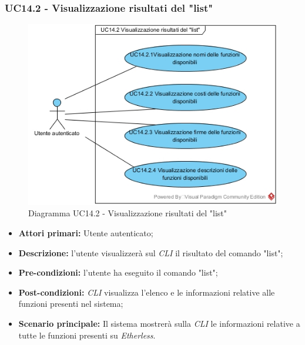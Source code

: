 \subsubsection{UC14.2 - Visualizzazione risultati del "list"}
\begin{figure}[h]
	\centering
	\includegraphics[width=0.7\linewidth]{res/img/UC14.2.jpg}
	\caption{Diagramma UC14.2 - Visualizzazione risultati del "list"}
\end{figure}
\begin{itemize}
	\item \textbf{Attori primari:} Utente autenticato;
	\item \textbf{Descrizione:} l'utente visualizzerà sul \textit{CLI\glo} il risultato del comando "list";
	\item \textbf{Pre-condizioni:} l'utente ha eseguito il comando "list";
	\item \textbf{Post-condizioni:} \textit{CLI\glo} visualizza l'elenco e le informazioni relative alle funzioni presenti nel sistema;
	\item \textbf{Scenario principale:} Il sistema mostrerà sulla \textit{CLI\glo} le informazioni relative a tutte le funzioni presenti su \textit{Etherless\glos}.
\end{itemize}